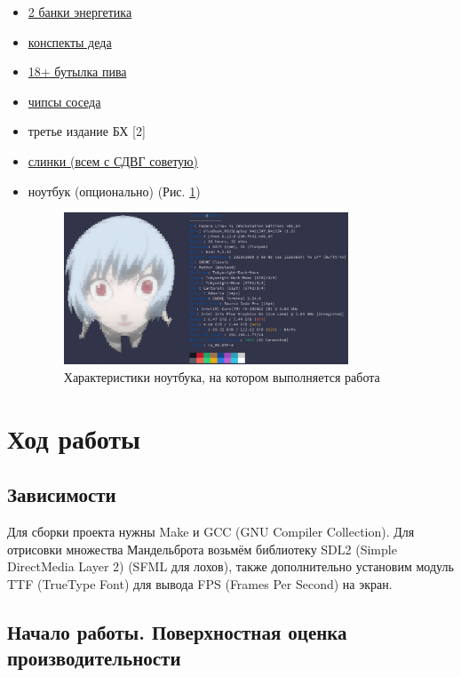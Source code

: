 \documentclass[12pt,a4paper]{article}
\begin{document}
\begin{itemize}
    \item \href{https://adrenalinerush.ru/}{2 банки энергетика}
    \item \href{http://ded32.net.ru/}{конспекты деда}
    \item \href{https://www.tver.ru/info/prokuratura/proletarskiy-rayon/razyasneniya/39923/}{18+ бутылка пива}
    \item \href{https://github.com/71frukt}{чипсы соседа}
    \item третье издание БХ [2]
    \item \href{https://www.mirpruzhin.ru/}{слинки (всем с СДВГ советую)}
    \item ноутбук (опционально) (Рис. \ref{fig:nout})
    \begin{figure}[ht!]
        \centering
        \includegraphics[width=0.8\textwidth]{nout.png}
        \caption{Характеристики ноутбука, на котором выполняется работа}
        \label{fig:nout}
    \end{figure}
\end{itemize}

\section{Ход работы}

\subsection{Зависимости}

Для сборки проекта нужны Make и GCC (GNU Compiler Collection). Для отрисовки множества Мандельброта возьмём библиотеку SDL2 (Simple DirectMedia Layer 2) (SFML для лохов), также дополнительно установим модуль TTF (TrueType Font) для вывода FPS (Frames Per Second) на экран.

\subsection{Начало работы. Поверхностная оценка производительности}
\end{document}
